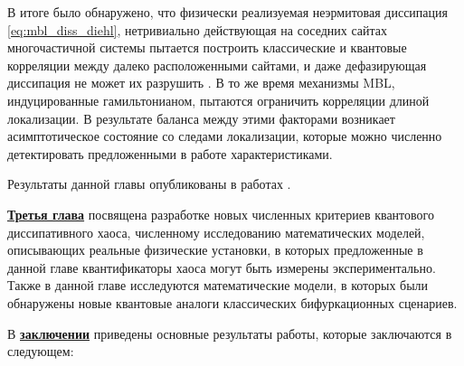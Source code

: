 В итоге было обнаружено, что физически реализуемая неэрмитовая диссипация \cref{eq:mbl_diss_diehl}, нетривиально действующая на соседних сайтах многочастичной системы пытается построить классические и квантовые корреляции между далеко расположенными сайтами, и даже дефазирующая диссипация не может их разрушить \cite{Vakulchyk2018}. 
В то же время механизмы MBL, индуцированные гамильтонианом, пытаются ограничить корреляции длиной локализации. 
В результате баланса между этими факторами возникает асимптотическое состояние со следами локализации, которые можно численно детектировать предложенными в работе характеристиками.  

Результаты данной главы опубликованы в работах \cite{Yusipov2017, Vershinina2017, Yusipov2018, Vakulchyk2018, sessiann_2017, rf_2017, shilnikov_2017}.


\underline{\textbf{Третья глава}} посвящена разработке новых численных критериев квантового диссипативного хаоса, численному исследованию математических моделей, описывающих реальные физические установки, в которых предложенные в данной главе квантификаторы хаоса могут быть измерены экспериментально. 
Также в данной главе исследуются математические модели, в которых были обнаружены новые квантовые аналоги классических бифуркационных сценариев.

\FloatBarrier
{}                                  %
В \underline{\textbf{заключении}} приведены основные результаты работы, которые заключаются в следующем:



